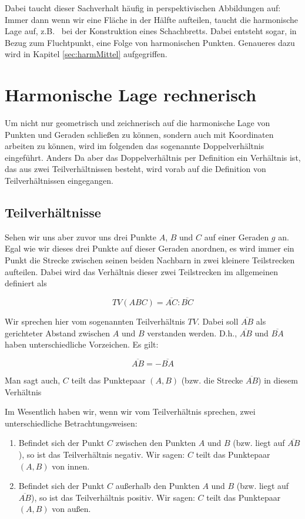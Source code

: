 \documentclass[12pt,a4paper]{article}
\begin{document}
Dabei taucht dieser Sachverhalt häufig in perspektivischen Abbildungen auf: Immer dann wenn wir eine Fläche in der Hälfte aufteilen, taucht die harmonische Lage auf, z.B.~ bei der Konstruktion eines Schachbretts. Dabei entsteht sogar, in Bezug zum Fluchtpunkt, eine Folge von harmonischen Punkten. Genaueres dazu wird in Kapitel \ref{sec:harmMittel} aufgegriffen.

\newpage
\section{Harmonische Lage rechnerisch}
Um nicht nur geometrisch und zeichnerisch auf die harmonische Lage von Punkten und Geraden schließen zu können, sondern auch mit Koordinaten arbeiten zu können, wird im folgenden das sogenannte Doppelverhältnis eingeführt. Anders Da aber das Doppelverhältnis per Definition ein Verhältnis ist, das aus zwei Teilverhältnissen besteht, wird vorab auf die Definition von Teilverhältnissen eingegangen.

\subsection{Teilverhältnisse}
Sehen wir uns aber zuvor uns drei Punkte $A$, $B$ und $C$ auf einer Geraden $g$ an. Egal wie wir dieses drei Punkte auf dieser Geraden anordnen, es wird immer ein Punkt die Strecke zwischen seinen beiden Nachbarn in zwei kleinere Teilstrecken aufteilen. Dabei wird das Verhältnis dieser zwei Teilstrecken im allgemeinen definiert als

\[TV(A B C) = \overline{A C} : \overline{B C}\]

Wir sprechen hier vom sogenannten Teilverhältnis $TV$. Dabei soll $\overline{A B}$ als gerichteter Abstand zwischen $A$ und $B$ verstanden werden. D.h., $\overline{A B}$ und $\overline{B A}$ haben unterschiedliche Vorzeichen. Es gilt: 

\[\overline{A B} = -\overline{B A}\]

Man sagt auch, $C$ teilt das Punktepaar $(A , B)$ (bzw. die Strecke $\overline{A B}$) in diesem Verhältnis \citep[S.~76]{projektiveGeometrie}

Im Wesentlich haben wir, wenn wir vom Teilverhältnis sprechen, zwei unterschiedliche Betrachtungsweisen:
\begin{enumerate}
\item Befindet sich der Punkt $C$ zwischen den Punkten $A$ und $B$ (bzw. liegt auf $\overline{A B}$), so ist das Teilverhältnis negativ. Wir sagen: $C$ teilt das Punktepaar $(A , B)$ \glqq von innen\grqq .
\item Befindet sich der Punkt $C$ außerhalb den Punkten $A$ und $B$ (bzw. liegt auf $\overline{A B}$), so ist das Teilverhältnis positiv. Wir sagen: $C$ teilt das Punktepaar $(A , B)$ \glqq von außen\grqq .
\end{enumerate}
\end{document}
